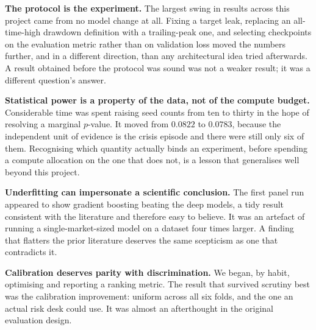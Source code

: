 \documentclass[11pt,a4paper]{article}
\begin{document}
\textbf{The protocol is the experiment.} The largest swing in results across
this project came from no model change at all. Fixing a target leak, replacing
an all-time-high drawdown definition with a trailing-peak one, and selecting
checkpoints on the evaluation metric rather than on validation loss moved the
numbers further, and in a different direction, than any architectural idea
tried afterwards. A result obtained before the protocol was sound was not a
weaker result; it was a different question's answer.

\textbf{Statistical power is a property of the data, not of the compute
budget.} Considerable time was spent raising seed counts from ten to thirty in
the hope of resolving a marginal $p$-value. It moved from $0.0822$ to $0.0783$,
because the independent unit of evidence is the crisis episode and there were
still only six of them. Recognising which quantity actually binds an
experiment, before spending a compute allocation on the one that does not, is a
lesson that generalises well beyond this project.

\textbf{Underfitting can impersonate a scientific conclusion.} The first panel
run appeared to show gradient boosting beating the deep models, a tidy result
consistent with the literature and therefore easy to believe. It was an
artefact of running a single-market-sized model on a dataset four times larger.
A finding that flatters the prior literature deserves the same scepticism as
one that contradicts it.

\textbf{Calibration deserves parity with discrimination.} We began, by habit,
optimising and reporting a ranking metric. The result that survived scrutiny
best was the calibration improvement: uniform across all six folds, and the one
an actual risk desk could use. It was almost an afterthought in the original
evaluation design.
\end{document}
